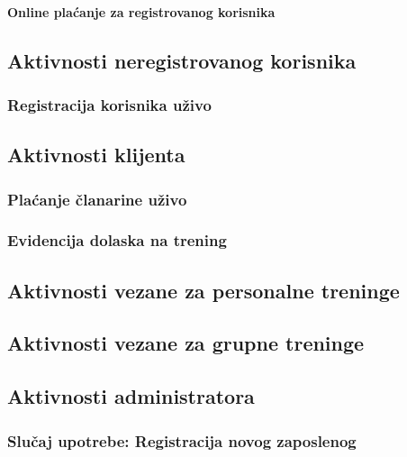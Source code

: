 \documentclass[a4paper]{article}
\begin{document}
\paragraph{Online plaćanje za registrovanog korisnika}


\subsection{Aktivnosti neregistrovanog korisnika}
\subsubsection{Registracija korisnika uživo}


\subsection{Aktivnosti klijenta}
\subsubsection{Plaćanje članarine uživo}


\subsubsection{Evidencija dolaska na trening}


\newpage
\subsection{Aktivnosti vezane za personalne treninge}


\subsection{Aktivnosti vezane za grupne treninge}


\subsection{Aktivnosti administratora}
\subsubsection{Slučaj upotrebe: Registracija novog zaposlenog}

\end{document}
